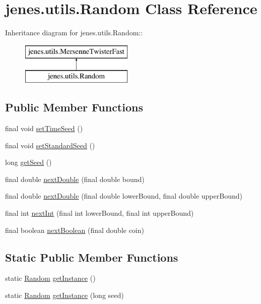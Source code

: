 \hypertarget{classjenes_1_1utils_1_1_random}{
\section{jenes.utils.Random Class Reference}
\label{classjenes_1_1utils_1_1_random}
}
Inheritance diagram for jenes.utils.Random::\begin{figure}[H]
\begin{center}
\leavevmode
\includegraphics[height=2cm]{classjenes_1_1utils_1_1_random}
\end{center}
\end{figure}
\subsection*{Public Member Functions}
\begin{CompactItemize}
\item 
final void \hyperlink{classjenes_1_1utils_1_1_random_6eec3abcf133f7ce43d6a13441523a01}{setTimeSeed} ()
\item 
final void \hyperlink{classjenes_1_1utils_1_1_random_484017ff9c5473f7fc3fc7b52cb92433}{setStandardSeed} ()
\item 
long \hyperlink{classjenes_1_1utils_1_1_random_55f9b0a836c137e520658f55ad806859}{getSeed} ()
\item 
final double \hyperlink{classjenes_1_1utils_1_1_random_be2919ddf9245e0576591fa0ea26593f}{nextDouble} (final double bound)
\item 
final double \hyperlink{classjenes_1_1utils_1_1_random_19babaa9c19de0243430cef2c445df9c}{nextDouble} (final double lowerBound, final double upperBound)
\item 
final int \hyperlink{classjenes_1_1utils_1_1_random_b066d2d2f6d32c89598c552a9dadedc0}{nextInt} (final int lowerBound, final int upperBound)
\item 
final boolean \hyperlink{classjenes_1_1utils_1_1_random_16e9050a46f8218ec8e0f73c6456a5db}{nextBoolean} (final double coin)
\end{CompactItemize}
\subsection*{Static Public Member Functions}
\begin{CompactItemize}
\item 
static \hyperlink{classjenes_1_1utils_1_1_random}{Random} \hyperlink{classjenes_1_1utils_1_1_random_a8b8341f82ccf69de0b44c9f6f174820}{getInstance} ()
\item 
static \hyperlink{classjenes_1_1utils_1_1_random}{Random} \hyperlink{classjenes_1_1utils_1_1_random_83dd69fffe081a48e58702c0f118b12e}{getInstance} (long seed)
\end{CompactItemize}
